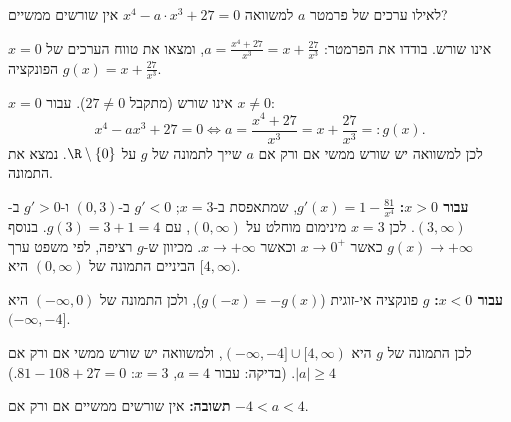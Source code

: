 
\begin{question}
לאילו ערכים של פרמטר $a$ למשוואה $x^4-a\cdot x^3+27=0$ אין שורשים ממשיים?
\end{question}

\begin{hint}
$x=0$ אינו שורש. בודדו את הפרמטר: $a=\frac{x^4+27}{x^3}=x+\frac{27}{x^3}$, ומצאו את טווח הערכים של הפונקציה $g(x)=x+\frac{27}{x^3}$.
\end{hint}

\begin{solution}
$x=0$ אינו שורש (מתקבל $27\neq0$). עבור $x\neq0$:
\[
x^4-ax^3+27=0\iff a=\frac{x^4+27}{x^3}=x+\frac{27}{x^3}=:g(x).
\]
לכן למשוואה יש שורש ממשי אם ורק אם $a$ שייך לתמונה של $g$ על $\R\setminus\{0\}$. נמצא את התמונה.

\textbf{עבור $x>0$:} $g'(x)=1-\frac{81}{x^4}$, שמתאפסת ב-$x=3$; $g'<0$ ב-$(0,3)$ ו-$g'>0$ ב-$(3,\infty)$. לכן $x=3$ מינימום מוחלט על $(0,\infty)$, עם $g(3)=3+1=4$. בנוסף $g(x)\to+\infty$ כאשר $x\to0^+$ וכאשר $x\to+\infty$. מכיוון ש-$g$ רציפה, לפי משפט ערך הביניים התמונה של $(0,\infty)$ היא $[4,\infty)$.

\textbf{עבור $x<0$:} $g$ פונקציה אי-זוגית ($g(-x)=-g(x)$), ולכן התמונה של $(-\infty,0)$ היא $(-\infty,-4]$.

לכן התמונה של $g$ היא $(-\infty,-4]\cup[4,\infty)$, ולמשוואה יש שורש ממשי אם ורק אם $|a|\ge4$. (בדיקה: עבור $a=4$, $x=3$: $81-108+27=0$.)

\textbf{תשובה:} אין שורשים ממשיים אם ורק אם $-4<a<4$.
\end{solution}
